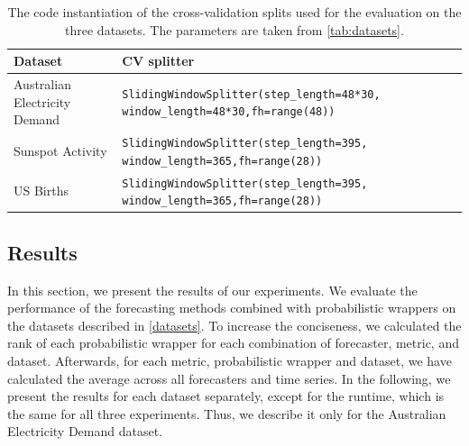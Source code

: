 \begin{table}[h]
    \centering
    \footnotesize
    \caption{The code instantiation of the cross-validation splits used for the evaluation on the three datasets. The parameters are taken from \autoref{tab:datasets}.}
    \label{tab:cv_splits}
    \begin{tabularx}{\textwidth}{X|X}
         \toprule
        Dataset & CV splitter \\ \midrule
        Australian Electricity Demand & \texttt{SlidingWindowSplitter(step_length=48*30, window_length=48*30,fh=range(48))} \\
        Sunspot Activity & \texttt{SlidingWindowSplitter(step_length=395, window_length=365,fh=range(28))}\\
        US Births & \texttt{SlidingWindowSplitter(step_length=395, window_length=365,fh=range(28))}\\
        \bottomrule
    \end{tabularx}
\end{table}




\subsection{Results} \label{results}
In this section, we present the results of our experiments. We evaluate the performance of the forecasting methods combined with probabilistic wrappers on the datasets described in \autoref{datasets}.
To increase the conciseness, we calculated the rank of each probabilistic wrapper for each combination of forecaster, metric, and dataset. Afterwards, for each metric, probabilistic wrapper and dataset, we have calculated the average across all forecasters and time series. In the following, we present the results for each dataset separately, except for the runtime, which is the same for all three experiments. Thus, we describe it only for the Australian Electricity Demand dataset.


